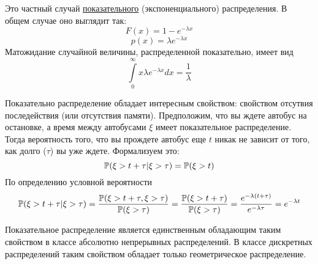 \documentclass[../TV&MS.tex]{subfiles}
\begin{document}
Это частный случай \underline{показательного} (экспоненциального) распределения. В общем случае оно выглядит так:
$$F(x) = 1 - e^{-\lambda x}$$
$$p(x) = \lambda e^{-\lambda x}$$
Матожидание случайной величины, распределенной показательно, имеет вид
$$\int\limits_0^{\infty} x\lambda e^{-\lambda x}dx = \frac1{\lambda}$$

Показательно распределение обладает интересным свойством: свойством отсутвия последействия (или отсутствия памяти). Предположим, что вы ждете автобус на 
остановке, а время между автобусами $\xi$ имеет показательное распределение. Тогда вероятность того, что вы прождете автобус еще $t$ никак не зависит от того, 
как долго ($\tau$) вы уже ждете. Формализуем это:
$$ \mathbb{P}(\xi > t + \tau | \xi > \tau) = \mathbb{P}(\xi > t)$$
По определению условной вероятности
$$\mathbb{P}(\xi > t + \tau | \xi > \tau) = \frac{\mathbb{P}(\xi > t + \tau, \xi > \tau)}{\mathbb{P}(\xi > \tau)} = \frac{\mathbb{P}(\xi > t + \tau)}{\mathbb{P}(\xi > \tau)} = \frac{e^{-\lambda(t+\tau)}}{e^{-\lambda \tau}} = e^{-\lambda t}$$

Показательное распределение является единственным обладающим таким свойством в классе абсолютно непрерывных распределений. В классе дискретных распределений таким свойством обладает только геометрическое распределение.

\newpage
\end{document}

